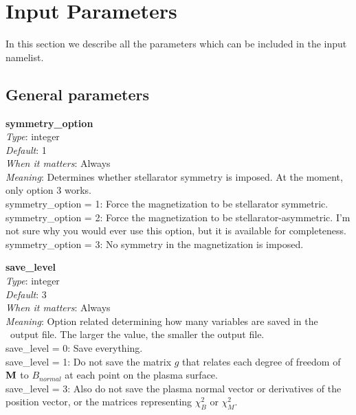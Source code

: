 \chapter{Input Parameters}
\label{ch:input}

\newcommand{\param}[5]{{\setlength{\parindent}{0cm} {\ttfamily \bfseries \hypertarget{#1}{#1}}\\{\it Type}: #2\\{\it Default}: #3\\{\it When it matters}: #4\\{\it Meaning}: #5}}
\newcommand{\myhrule}{{\setlength{\parindent}{0cm} \hrulefill }}

\newcommand{\true}{{\ttfamily .true.}}
\newcommand{\false}{{\ttfamily .false.}}

In this section we describe all the parameters which can be included in the input namelist. 

\section{General parameters}

\param{symmetry\_option}
{integer}
{1}
{Always}
{Determines whether stellarator symmetry is imposed. At the moment, only option 3 works.\\

{\ttfamily symmetry\_option} = 1: Force the magnetization to be stellarator symmetric.\\

{\ttfamily symmetry\_option} = 2: Force the magnetization to be stellarator-asymmetric. I'm not sure why you would ever use this option,
but it is available for completeness.\\

{\ttfamily symmetry\_option} = 3: No symmetry in the magnetization is imposed.
}

\myhrule

\param{save\_level}
{integer}
{3}
{Always}
{Option related determining how many variables are saved in the \netCDF~output file.  The larger the value, the smaller the output file.\\

{\ttfamily save\_level} = 0: Save everything.\\

{\ttfamily save\_level} = 1: Do not save the matrix $g$ that relates each degree of freedom of ${\mathbf M}$ to $B_{normal}$ at each point on the plasma surface.\\

{\ttfamily save\_level} = 3: Also do not save the plasma normal vector or derivatives of the position vector, or the matrices representing $\chi_B^2$ or $\chi_M^2$.
}

